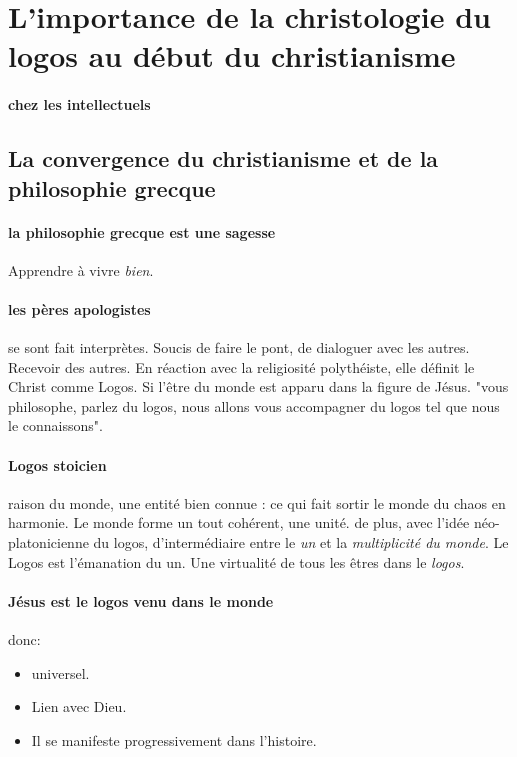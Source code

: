  

 
\section{L’importance de la christologie du logos au début du christianisme}

\paragraph{chez les intellectuels}

 \subsection{La convergence du christianisme et de la philosophie grecque}

 \paragraph{la philosophie grecque est une sagesse} Apprendre à vivre \textit{bien}. 

 \paragraph{les pères apologistes} se sont fait interprètes. Soucis de faire le pont, de dialoguer avec les autres. Recevoir des autres. En réaction avec la religiosité polythéiste, elle définit le Christ comme Logos. Si l'être du monde est apparu dans la figure de Jésus. "vous philosophe, parlez du logos, nous allons vous accompagner du logos tel que nous le connaissons".

 \paragraph{Logos stoicien} raison du monde, une entité bien connue : ce qui fait sortir le monde du chaos en harmonie. Le monde forme un tout cohérent, une unité. de plus, avec l'idée néo-platonicienne du logos, d'intermédiaire entre le \textit{un} et la \textit{multiplicité du monde}. Le Logos est l'émanation du un. Une virtualité de tous les êtres dans le \textit{logos}.

 \paragraph{Jésus est le logos venu dans le monde} donc:
 \begin{itemize}
     \item universel.     \item Lien avec Dieu.     \item Il se manifeste progressivement dans l'histoire. 
 \end{itemize}
 
